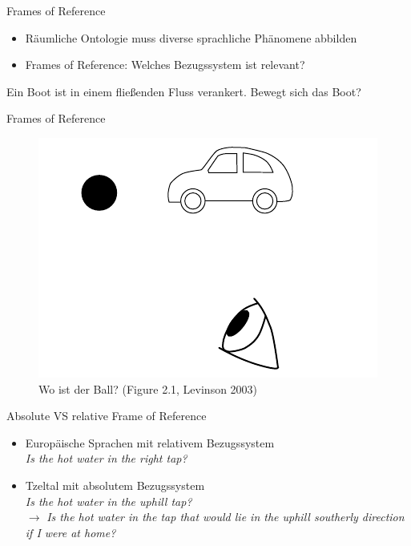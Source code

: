 \documentclass[12pt,a4paper]{beamer}
\begin{document}
\begin{frame}{Frames of Reference}
\begin{itemize}
\item Räumliche Ontologie muss diverse sprachliche Phänomene abbilden
\item Frames of Reference: Welches Bezugssystem ist relevant?
\end{itemize}

Ein Boot ist in einem fließenden Fluss verankert. Bewegt sich das Boot?

\end{frame}

\begin{frame}{Frames of Reference}

\begin{figure}
\includegraphics[scale=0.45]{img/levinson_fig_2-1.png}
\caption{Wo ist der Ball? (Figure 2.1, Levinson 2003)}
\end{figure}
\end{frame}


\begin{frame}{Absolute VS relative Frame of Reference}
\begin{itemize}
\item Europäische Sprachen mit relativem Bezugssystem \\
\textit{Is the hot water in the right tap?}
\item Tzeltal mit absolutem Bezugssystem \\
\textit{Is the hot water in the uphill tap?} \\
$\to$ \textit{Is the hot water in the tap that would lie in the uphill southerly direction if I were at home?}
\end{itemize}
\end{frame}
\end{document}
